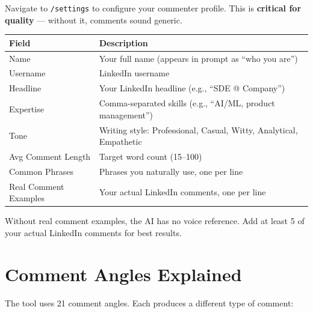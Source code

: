\documentclass[12pt,a4paper]{article}
\begin{document}
Navigate to \texttt{/settings} to configure your commenter profile. This is \textbf{critical for quality} --- without it, comments sound generic.

\begin{center}
\begin{tabularx}{\textwidth}{lX}
\toprule
\textbf{Field} & \textbf{Description} \\
\midrule
Name & Your full name (appears in prompt as ``who you are'') \\
Username & LinkedIn username \\
Headline & Your LinkedIn headline (e.g., ``SDE @ Company'') \\
Expertise & Comma-separated skills (e.g., ``AI/ML, product management'') \\
Tone & Writing style: Professional, Casual, Witty, Analytical, Empathetic \\
Avg Comment Length & Target word count (15--100) \\
Common Phrases & Phrases you naturally use, one per line \\
Real Comment Examples & Your actual LinkedIn comments, one per line \\
\bottomrule
\end{tabularx}
\end{center}

\begin{warnbox}
Without real comment examples, the AI has no voice reference. Add at least 5 of your actual LinkedIn comments for best results.
\end{warnbox}

\section{Comment Angles Explained}

The tool uses 21 comment angles. Each produces a different type of comment:
\end{document}
